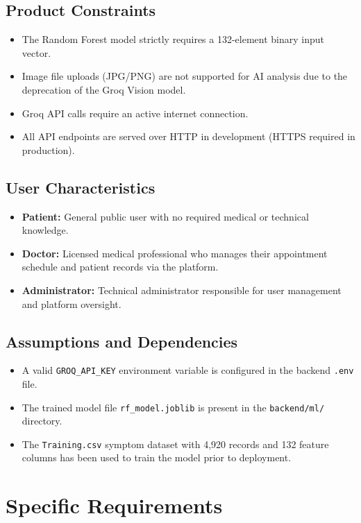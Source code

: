 \subsection{Product Constraints}
\begin{itemize}
    \item The Random Forest model strictly requires a 132-element binary input vector.
    \item Image file uploads (JPG/PNG) are not supported for AI analysis due to the deprecation of the Groq Vision model.
    \item Groq API calls require an active internet connection.
    \item All API endpoints are served over HTTP in development (HTTPS required in production).
\end{itemize}

\subsection{User Characteristics}
\begin{itemize}
    \item \textbf{Patient:} General public user with no required medical or technical knowledge.
    \item \textbf{Doctor:} Licensed medical professional who manages their appointment schedule and patient records via the platform.
    \item \textbf{Administrator:} Technical administrator responsible for user management and platform oversight.
\end{itemize}

\subsection{Assumptions and Dependencies}
\begin{itemize}
    \item A valid \texttt{GROQ\_API\_KEY} environment variable is configured in the backend \texttt{.env} file.
    \item The trained model file \texttt{rf\_model.joblib} is present in the \texttt{backend/ml/} directory.
    \item The \texttt{Training.csv} symptom dataset with 4,920 records and 132 feature columns has been used to train the model prior to deployment.
\end{itemize}

\section{Specific Requirements}

